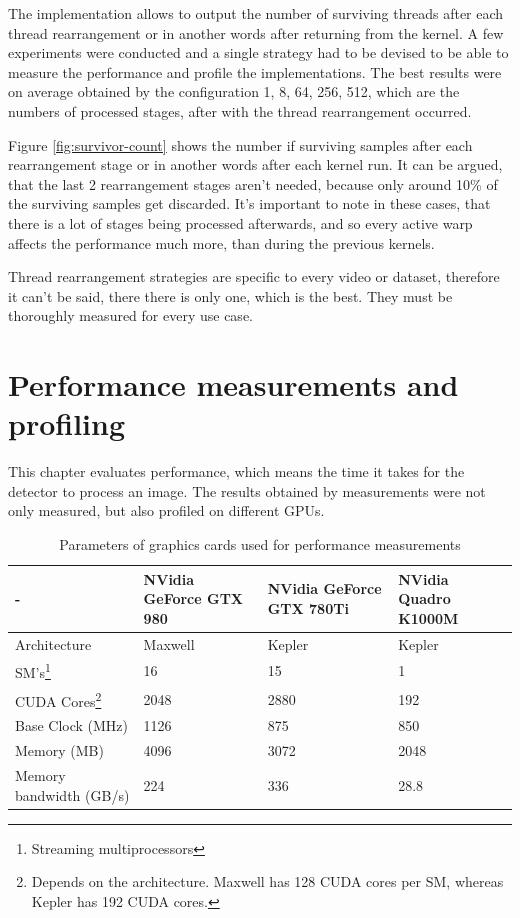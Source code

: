 The implementation allows to output the number of surviving threads after each thread rearrangement or in another words after returning from the kernel. A few experiments were conducted and a single strategy had to be devised to be able to measure the performance and profile the implementations. The best results were on average obtained by the configuration 1, 8, 64, 256, 512, which are the numbers of processed stages, after with the thread rearrangement occurred.

Figure \ref{fig:survivor-count} shows the number if surviving samples after each rearrangement stage or in another words after each kernel run. It can be argued, that the last 2 rearrangement stages aren't needed, because only around 10\% of the surviving samples get discarded. It's important to note in these cases, that there is a lot of stages being processed afterwards, and so every active warp affects the performance much more, than during the previous kernels.

Thread rearrangement strategies are specific to every video or dataset, therefore it can't be said, there there is only one, which is the best. They must be thoroughly measured for every use case.

\chapter{Performance measurements and profiling}\label{ch:measure}

This chapter evaluates performance, which means the time it takes for the detector to process an image. The results obtained by measurements were not only measured, but also profiled on different GPUs.

\begin{center}
\begin{table}[htbp]
\begin{tabularx}{\textwidth}{| X | X | X | X |}
\hline
- & NVidia GeForce GTX 980 & NVidia GeForce GTX 780Ti & NVidia Quadro K1000M \\
\hline
Architecture & Maxwell & Kepler & Kepler \\
\hline
SM's\footnote{Streaming multiprocessors} & 16 & 15 & 1 \\
\hline
CUDA Cores\footnote{Depends on the architecture. Maxwell has 128 CUDA cores per SM, whereas Kepler has 192 CUDA cores.} & 2048 & 2880 & 192 \\
\hline
Base Clock (MHz) & 1126 & 875 & 850 \\
\hline
Memory (MB) & 4096 & 3072 & 2048 \\
\hline
Memory bandwidth (GB/s) & 224 & 336 & 28.8 \\
\hline
\end{tabularx}
\caption{Parameters of graphics cards used for performance measurements}
\label{tab:parameters-gpu}
\end{table}
\end{center}

